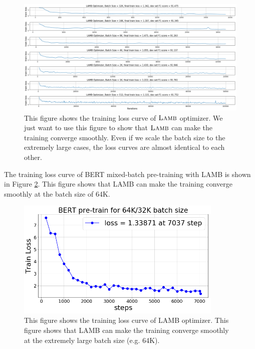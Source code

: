 \begin{figure}[tb]
\vspace{5pt}
\centering
\includegraphics[width=1.08\textwidth]{figs/bert_train_loss.png}
\caption{This figure shows the training loss curve of $\textsc{Lamb}$ optimizer. We just want to use this figure to show that $\textsc{Lamb}$ can make the training converge smoothly. Even if we scale the batch size to the extremely large cases, the loss curves are almost identical to each other.}
\label{fig:bert_train_loss}
\vspace{-10pt}
\end{figure}

The training loss curve of BERT mixed-batch pre-training with LAMB is shown in Figure \ref{fig:bert_lamb_loss}.
This figure shows that LAMB can make the training converge smoothly at the batch size of 64K.

\begin{figure}[tb]
\vspace{5pt}
\centering
\includegraphics[width=0.88\textwidth]{figs/64k_32k_loss.png}
\caption{This figure shows the training loss curve of LAMB optimizer. This figure shows that LAMB can make the training converge smoothly at the extremely large batch size (e.g. 64K).}
\label{fig:bert_lamb_loss}
\vspace{-10pt}
\end{figure}


